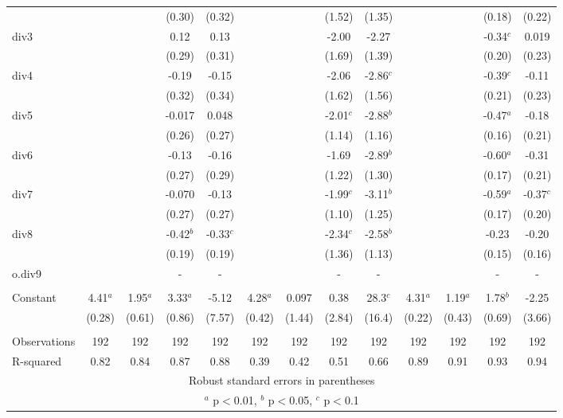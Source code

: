 \documentclass[]{article}
\begin{document}
\begin{tabular}{lcccccccccccc}
 &  &  & (0.30) & (0.32) &  &  & (1.52) & (1.35) &  &  & (0.18) & (0.22) \\
div3 &  &  & 0.12 & 0.13 &  &  & -2.00 & -2.27 &  &  & -0.34$^c$ & 0.019 \\
 &  &  & (0.29) & (0.31) &  &  & (1.69) & (1.39) &  &  & (0.20) & (0.23) \\
div4 &  &  & -0.19 & -0.15 &  &  & -2.06 & -2.86$^c$ &  &  & -0.39$^c$ & -0.11 \\
 &  &  & (0.32) & (0.34) &  &  & (1.62) & (1.56) &  &  & (0.21) & (0.23) \\
div5 &  &  & -0.017 & 0.048 &  &  & -2.01$^c$ & -2.88$^b$ &  &  & -0.47$^a$ & -0.18 \\
 &  &  & (0.26) & (0.27) &  &  & (1.14) & (1.16) &  &  & (0.16) & (0.21) \\
div6 &  &  & -0.13 & -0.16 &  &  & -1.69 & -2.89$^b$ &  &  & -0.60$^a$ & -0.31 \\
 &  &  & (0.27) & (0.29) &  &  & (1.22) & (1.30) &  &  & (0.17) & (0.21) \\
div7 &  &  & -0.070 & -0.13 &  &  & -1.99$^c$ & -3.11$^b$ &  &  & -0.59$^a$ & -0.37$^c$ \\
 &  &  & (0.27) & (0.27) &  &  & (1.10) & (1.25) &  &  & (0.17) & (0.20) \\
div8 &  &  & -0.42$^b$ & -0.33$^c$ &  &  & -2.34$^c$ & -2.58$^b$ &  &  & -0.23 & -0.20 \\
 &  &  & (0.19) & (0.19) &  &  & (1.36) & (1.13) &  &  & (0.15) & (0.16) \\
o.div9 &  &  & - & - &  &  & - & - &  &  & - & - \\
 &  &  &  &  &  &  &  &  &  &  &  &  \\
Constant & 4.41$^a$ & 1.95$^a$ & 3.33$^a$ & -5.12 & 4.28$^a$ & 0.097 & 0.38 & 28.3$^c$ & 4.31$^a$ & 1.19$^a$ & 1.78$^b$ & -2.25 \\
 & (0.28) & (0.61) & (0.86) & (7.57) & (0.42) & (1.44) & (2.84) & (16.4) & (0.22) & (0.43) & (0.69) & (3.66) \\
 &  &  &  &  &  &  &  &  &  &  &  &  \\
Observations & 192 & 192 & 192 & 192 & 192 & 192 & 192 & 192 & 192 & 192 & 192 & 192 \\
 R-squared & 0.82 & 0.84 & 0.87 & 0.88 & 0.39 & 0.42 & 0.51 & 0.66 & 0.89 & 0.91 & 0.93 & 0.94 \\ \hline
\multicolumn{13}{c}{ Robust standard errors in parentheses} \\
\multicolumn{13}{c}{ $^a$ p$<$0.01, $^b$ p$<$0.05, $^c$ p$<$0.1} \\
\end{tabular}
\end{document}
